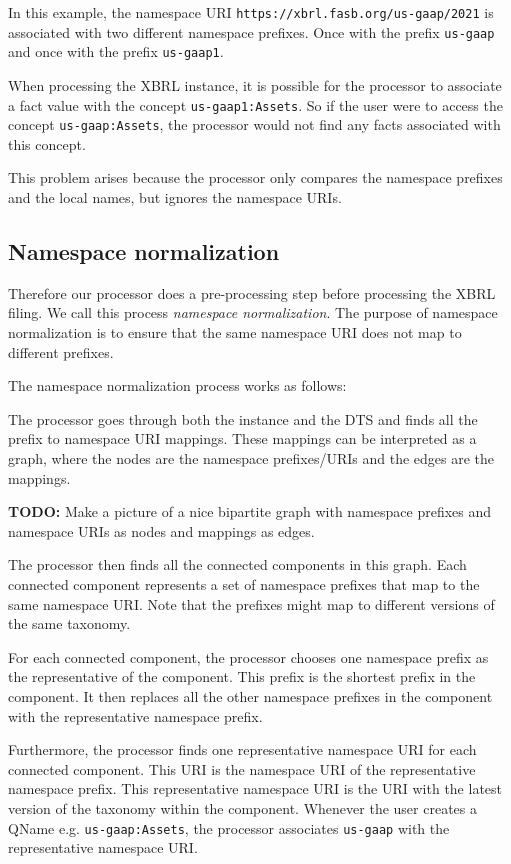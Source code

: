 In this example, the namespace URI \texttt{https://xbrl.fasb.org/us-gaap/2021} is associated with two different namespace prefixes.
Once with the prefix \texttt{us-gaap} and once with the prefix \texttt{us-gaap1}.

When processing the XBRL instance, it is possible for the processor to associate a fact value with the concept \texttt{us-gaap1:Assets}.
So if the user were to access the concept \texttt{us-gaap:Assets}, the processor would not find any facts associated with this concept.

This problem arises because the processor only compares the namespace prefixes and the local names, but ignores the namespace URIs.

\subsection{Namespace normalization}

Therefore our processor does a pre-processing step before processing the XBRL filing. We call this process \textit{namespace normalization}.
The purpose of namespace normalization is to ensure that the same namespace URI does not map to different prefixes.

The namespace normalization process works as follows:

The processor goes through both the instance and the DTS and finds all the prefix to namespace URI mappings. 
These mappings can be interpreted as a graph, where the nodes are the namespace prefixes/URIs and the edges are the mappings.

\textbf{TODO:} Make a picture of a nice bipartite graph with namespace prefixes and namespace URIs as nodes and mappings as edges.

The processor then finds all the connected components in this graph. 
Each connected component represents a set of namespace prefixes that map to the same namespace URI. 
Note that the prefixes might map to different versions of the same taxonomy.

For each connected component, the processor chooses one namespace prefix as the representative of the component.
This prefix is the shortest prefix in the component.
It then replaces all the other namespace prefixes in the component with the representative namespace prefix.

Furthermore, the processor finds one representative namespace URI for each connected component.
This URI is the namespace URI of the representative namespace prefix. 
This representative namespace URI is the URI with the latest version of the taxonomy within the component.
Whenever the user creates a QName e.g. \texttt{us-gaap:Assets}, the processor associates \texttt{us-gaap} with the representative namespace URI.

